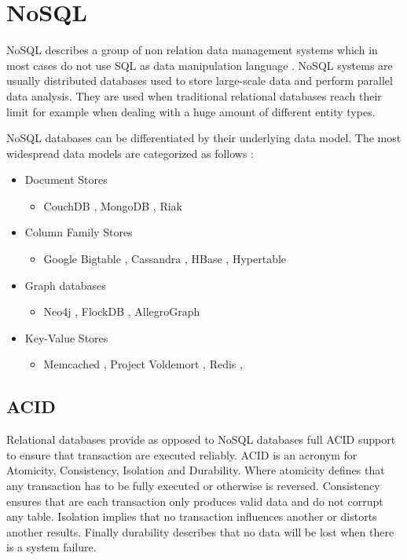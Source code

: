 \section{NoSQL}
\label{sec:nosql}
\acf{NoSQL} describes a group of non relation data management systems which in most cases do not use \acf{SQL} as data manipulation language \cite[1]{moniruzzaman.2013}. \ac{NoSQL} systems are usually distributed databases used to store large-scale data and perform parallel data analysis. They are used when traditional relational databases reach their limit for example when dealing with a huge amount of different entity types. \cite[1 - 2]{moniruzzaman.2013} \cite[23]{orend.2010}

NoSQL databases can be differentiated by their underlying data model. The most widespread data models are categorized as follows \cite[34]{ellis.2010} \cite[2 - 3]{hecht.2011}:

\begin{itemize}
  \item Document Stores
    \begin{itemize}
      \item CouchDB \cite{couch.2014}, MongoDB \cite{mongo.2014}, Riak \cite{riak.2014}
    \end{itemize}
  \item Column Family Stores
    \begin{itemize}
      \item Google Bigtable \cite{chang.2006}, Cassandra \cite{cassandra.2014}, HBase \cite{hbase.2014}, Hypertable \cite{hypertable.2014}
    \end{itemize}
  \item Graph databases
    \begin{itemize}
      \item Neo4j \cite{neo4j.2014}, FlockDB \cite{flock.2010}, AllegroGraph \cite{allegro.2014}
    \end{itemize}
  \item Key-Value Stores
    \begin{itemize}
      \item Memcached \cite{memcached.2014}, Project Voldemort \cite{voldemort.2013}, Redis \cite{redis.2014}, 
    \end{itemize}
\end{itemize}

\subsection{ACID}
\label{subsec:acid}
Relational databases provide as opposed to \ac{NoSQL} databases full ACID support to ensure that transaction are executed reliably. ACID is an acronym for Atomicity, Consistency, Isolation and Durability. Where atomicity defines that any transaction has to be fully executed or otherwise is reversed. Consistency ensures that are each transaction only produces valid data and do not corrupt any table. Isolation implies that no transaction influences another or distorts another results. Finally durability describes that no data will be lost when there is a system failure. \cite[71]{pokorny.2011}

